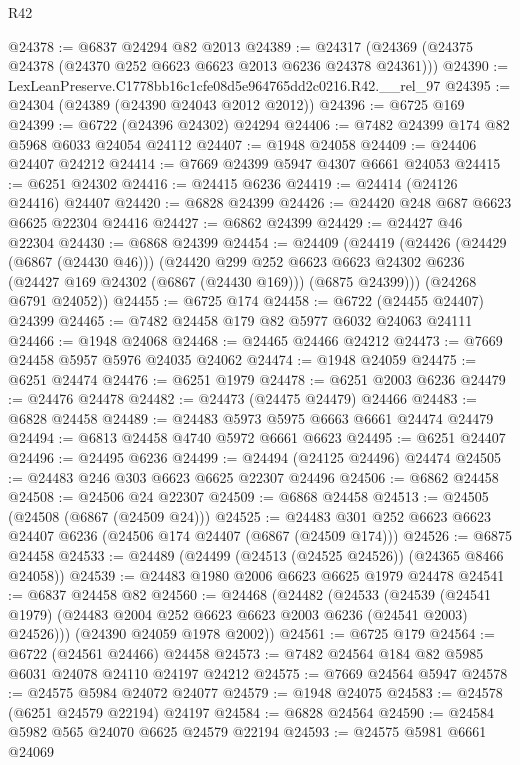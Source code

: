 \begin{lexlean}{R42}
\begin{coremodule}
{@24378 := @6837 @24294 @82 @2013
@24389 := @24317 (@24369 (@24375 @24378 (@24370 @252 @6623 @6623 @2013 @6236 @24378 @24361)))
@24390 := LexLeanPreserve.C1778bb16c1cfe08d5e964765dd2c0216.R42.__rel_97
@24395 := @24304 (@24389 (@24390 @24043 @2012 @2012))
@24396 := @6725 @169
@24399 := @6722 (@24396 @24302) @24294
@24406 := @7482 @24399 @174 @82 @5968 @6033 @24054 @24112
@24407 := @1948 @24058
@24409 := @24406 @24407 @24212
@24414 := @7669 @24399 @5947 @4307 @6661 @24053
@24415 := @6251 @24302
@24416 := @24415 @6236
@24419 := @24414 (@24126 @24416) @24407
@24420 := @6828 @24399
@24426 := @24420 @248 @687 @6623 @6625 @22304 @24416
@24427 := @6862 @24399
@24429 := @24427 @46 @22304
@24430 := @6868 @24399
@24454 := @24409
    (@24419
      (@24426
        (@24429 (@6867 (@24430 @46)))
        (@24420
          @299
          @252
          @6623
          @6623
          @24302
          @6236
          (@24427 @169 @24302 (@6867 (@24430 @169)))
          (@6875 @24399)))
      (@24268 @6791 @24052))
@24455 := @6725 @174
@24458 := @6722 (@24455 @24407) @24399
@24465 := @7482 @24458 @179 @82 @5977 @6032 @24063 @24111
@24466 := @1948 @24068
@24468 := @24465 @24466 @24212
@24473 := @7669 @24458 @5957 @5976 @24035 @24062
@24474 := @1948 @24059
@24475 := @6251 @24474
@24476 := @6251 @1979
@24478 := @6251 @2003 @6236
@24479 := @24476 @24478
@24482 := @24473 (@24475 @24479) @24466
@24483 := @6828 @24458
@24489 := @24483 @5973 @5975 @6663 @6661 @24474 @24479
@24494 := @6813 @24458 @4740 @5972 @6661 @6623
@24495 := @6251 @24407
@24496 := @24495 @6236
@24499 := @24494 (@24125 @24496) @24474
@24505 := @24483 @246 @303 @6623 @6625 @22307 @24496
@24506 := @6862 @24458
@24508 := @24506 @24 @22307
@24509 := @6868 @24458
@24513 := @24505 (@24508 (@6867 (@24509 @24)))
@24525 := @24483 @301 @252 @6623 @6623 @24407 @6236 (@24506 @174 @24407 (@6867 (@24509 @174)))
@24526 := @6875 @24458
@24533 := @24489 (@24499 (@24513 (@24525 @24526)) (@24365 @8466 @24058))
@24539 := @24483 @1980 @2006 @6623 @6625 @1979 @24478
@24541 := @6837 @24458 @82
@24560 := @24468
    (@24482
      (@24533
        (@24539 (@24541 @1979) (@24483 @2004 @252 @6623 @6623 @2003 @6236 (@24541 @2003) @24526)))
      (@24390 @24059 @1978 @2002))
@24561 := @6725 @179
@24564 := @6722 (@24561 @24466) @24458
@24573 := @7482 @24564 @184 @82 @5985 @6031 @24078 @24110 @24197 @24212
@24575 := @7669 @24564 @5947
@24578 := @24575 @5984 @24072 @24077
@24579 := @1948 @24075
@24583 := @24578 (@6251 @24579 @22194) @24197
@24584 := @6828 @24564
@24590 := @24584 @5982 @565 @24070 @6625 @24579 @22194
@24593 := @24575 @5981 @6661 @24069
}
\end{coremodule}
\end{lexlean}
